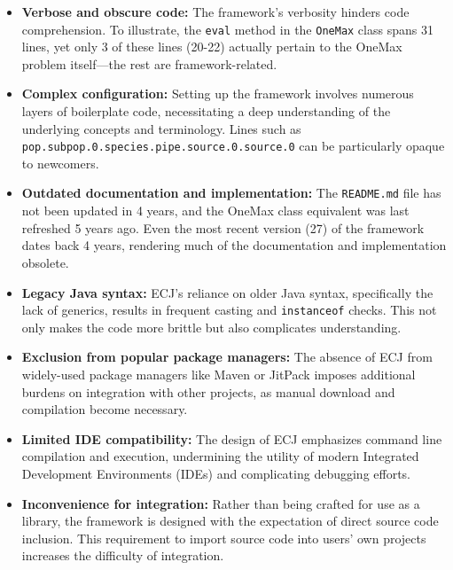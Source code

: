   \begin{itemize}
    \item \textbf{Verbose and obscure code:} The framework's verbosity hinders code comprehension.
    To illustrate, the \texttt{eval} method in the \texttt{OneMax} class spans 31 lines, yet only 3 of these lines (20-22) actually pertain to the OneMax problem itself—the rest are framework-related.

    \item \textbf{Complex configuration:} Setting up the framework involves numerous layers of boilerplate code, necessitating a deep understanding of the underlying concepts and terminology.
    Lines such as \texttt{pop.subpop.0.species.pipe.source.0.source.0} can be particularly opaque to newcomers.

    \item \textbf{Outdated documentation and implementation:} The \texttt{README.md} file has not been updated in 4 years, and the OneMax class equivalent was last refreshed 5 years ago.
    Even the most recent version (27) of the framework dates back 4 years, rendering much of the documentation and implementation obsolete.

    \item \textbf{Legacy Java syntax:} ECJ's reliance on older Java syntax, specifically the lack of generics, results in frequent casting and \texttt{instanceof} checks.
    This not only makes the code more brittle but also complicates understanding.

    \item \textbf{Exclusion from popular package managers:} The absence of ECJ from widely-used package managers like Maven or JitPack imposes additional burdens on integration with other projects, as manual download and compilation become necessary.

    \item \textbf{Limited IDE compatibility:} The design of ECJ emphasizes command line compilation and execution, undermining the utility of modern Integrated Development Environments (IDEs) and complicating debugging efforts.

    \item \textbf{Inconvenience for integration:} Rather than being crafted for use as a library, the framework is designed with the expectation of direct source code inclusion.
    This requirement to import source code into users' own projects increases the difficulty of integration.


\end{itemize}
